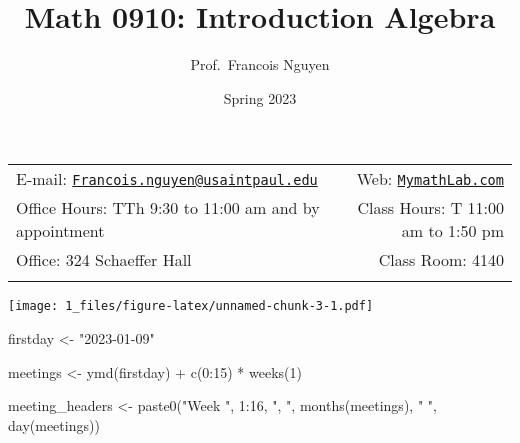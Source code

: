 \documentclass[]{article}
\title{Math 0910: Introduction Algebra}
\author{Prof.~Francois Nguyen}
\date{Spring 2023}
\makeatletter
\newenvironment{Shaded}{\begin{snugshade}}{\end{snugshade}}
\newcommand{\DecValTok}[1]{\textcolor[rgb]{0.00,0.00,0.81}{#1}}
\newcommand{\FunctionTok}[1]{\textcolor[rgb]{0.00,0.00,0.00}{#1}}
\newcommand{\NormalTok}[1]{#1}
\newcommand{\OtherTok}[1]{\textcolor[rgb]{0.56,0.35,0.01}{#1}}
\newcommand{\SpecialCharTok}[1]{\textcolor[rgb]{0.00,0.00,0.00}{#1}}
\newcommand{\StringTok}[1]{\textcolor[rgb]{0.31,0.60,0.02}{#1}}
\def\maxwidth{\ifdim\Gin@nat@width>\linewidth\linewidth
\else\Gin@nat@width\fi}
\let\Oldincludegraphics\includegraphics
\renewcommand{\includegraphics}[1]{\Oldincludegraphics[width=\maxwidth]{#1}}
\makeatother
\begin{document}
  

		\maketitle
		
	
		\thispagestyle{firststyle}



	\noindent \begin{tabular*}{\textwidth}{ @{\extracolsep{\fill}} lr @{\extracolsep{\fill}}}


E-mail: \texttt{\href{mailto:Francois.nguyen@usaintpaul.edu}{\nolinkurl{Francois.nguyen@usaintpaul.edu}}} & Web: \href{http://MymathLab.com}{\tt MymathLab.com}\\
Office Hours: TTh 9:30 to 11:00 am and by appointment  &  Class Hours: T
11:00 am to 1:50 pm\\
Office: 324 Schaeffer Hall  & Class Room: 4140\\
	&  \\
	\hline
	\end{tabular*}
	
\vspace{2mm}
	


\begin{Shaded}
\end{Shaded}

\texttt{[image: 1\_files/figure-latex/unnamed-chunk-3-1.pdf]}

\begin{Shaded}
\begin{Highlighting}[]
\NormalTok{firstday }\OtherTok{\textless{}{-}} \StringTok{"2023{-}01{-}09"}
    
\NormalTok{meetings }\OtherTok{\textless{}{-}} \FunctionTok{ymd}\NormalTok{(firstday) }\SpecialCharTok{+} \FunctionTok{c}\NormalTok{(}\DecValTok{0}\SpecialCharTok{:}\DecValTok{15}\NormalTok{) }\SpecialCharTok{*} \FunctionTok{weeks}\NormalTok{(}\DecValTok{1}\NormalTok{)}

\NormalTok{meeting\_headers }\OtherTok{\textless{}{-}} \FunctionTok{paste0}\NormalTok{(}\StringTok{"Week "}\NormalTok{, }\DecValTok{1}\SpecialCharTok{:}\DecValTok{16}\NormalTok{, }\StringTok{", "}\NormalTok{, }\FunctionTok{months}\NormalTok{(meetings), }\StringTok{" "}\NormalTok{, }\FunctionTok{day}\NormalTok{(meetings))}
\end{Highlighting}
\end{Shaded}
\end{document}
